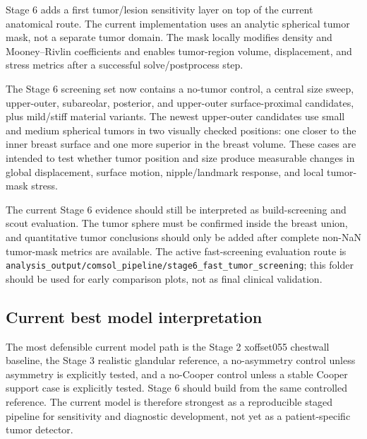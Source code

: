 Stage 6 adds a first tumor/lesion sensitivity layer on top of the current anatomical route. The current implementation uses an analytic spherical tumor mask, not a separate tumor domain. The mask locally modifies density and Mooney--Rivlin coefficients and enables tumor-region volume, displacement, and stress metrics after a successful solve/postprocess step.

The Stage 6 screening set now contains a no-tumor control, a central size sweep, upper-outer, subareolar, posterior, and upper-outer surface-proximal candidates, plus mild/stiff material variants. The newest upper-outer candidates use small and medium spherical tumors in two visually checked positions: one closer to the inner breast surface and one more superior in the breast volume. These cases are intended to test whether tumor position and size produce measurable changes in global displacement, surface motion, nipple/landmark response, and local tumor-mask stress.

The current Stage 6 evidence should still be interpreted as build-screening and scout evaluation. The tumor sphere must be confirmed inside the breast union, and quantitative tumor conclusions should only be added after complete non-NaN tumor-mask metrics are available. The active fast-screening evaluation route is \texttt{analysis\_output/comsol\_pipeline/stage6\_fast\_tumor\_screening}; this folder should be used for early comparison plots, not as final clinical validation.

\subsection{Current best model interpretation}

The most defensible current model path is the Stage 2 xoffset055 chestwall baseline, the Stage 3 realistic glandular reference, a no-asymmetry control unless asymmetry is explicitly tested, and a no-Cooper control unless a stable Cooper support case is explicitly tested. Stage 6 should build from the same controlled reference. The current model is therefore strongest as a reproducible staged pipeline for sensitivity and diagnostic development, not yet as a patient-specific tumor detector.
